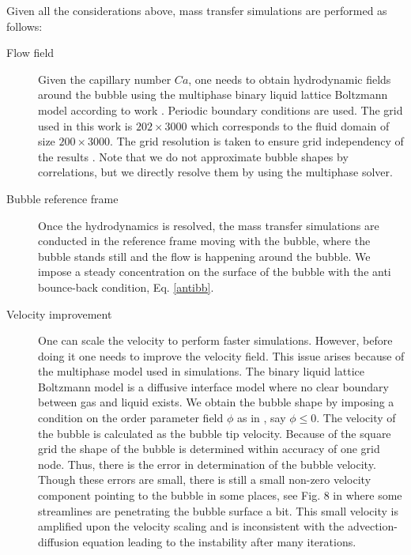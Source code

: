 \documentclass{article}
\begin{document}
Given all the considerations above, mass transfer simulations are performed as follows:
\begin{description}
 \item[Flow field] Given the capillary number $Ca$, one needs to obtain hydrodynamic fields around
the bubble using the multiphase binary liquid lattice Boltzmann model according to work
\cite{kuzmin-binary2d}. Periodic boundary conditions are used. The grid used in this work is
$202\times 3000$ which corresponds to the fluid domain  of size $200\times3000$. The grid resolution is
taken to ensure grid
independency of the results \cite{kuzmin-binary2d}. Note that we do not approximate bubble shapes by correlations, but we directly resolve them by using the multiphase solver. 
 \item[Bubble reference frame] Once the hydrodynamics is resolved, the mass transfer simulations
are conducted in the reference frame moving with the bubble, where the bubble stands still and the
flow is happening around the
bubble. We impose a steady concentration on the surface
of the bubble with the anti bounce-back condition, Eq. \ref{antibb}.
 \item[Velocity improvement] One can scale the velocity to
perform faster simulations. However, before doing it one needs to improve the velocity field.
This issue arises because of the
multiphase model used in simulations. The binary liquid lattice Boltzmann model is a diffusive
interface model where no clear boundary between gas and liquid exists.
We obtain the bubble shape by imposing a condition on the order parameter field $\phi$ as in \cite{kuzmin-binary2d}, say $\phi\leq0$. The velocity of the
bubble is calculated as the bubble tip velocity. Because of the square grid the shape of the bubble is determined within accuracy of one grid node. Thus,
there is the error in determination of the bubble velocity. Though these errors are small,
there is still a small non-zero velocity component pointing to the bubble in some places, see Fig. 8 in
\cite{kuzmin-binary2d} where some streamlines are penetrating the bubble surface a bit.
This small velocity is amplified upon the velocity scaling and is inconsistent with the
advection-diffusion equation leading to the instability after many iterations.


\end{description}
\end{document}
